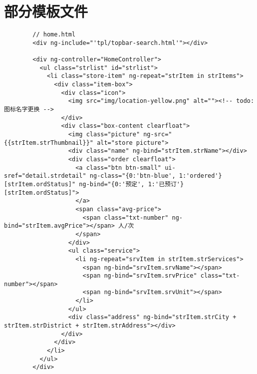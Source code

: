   \section{部分模板文件}
    \label{sec:部分模板文件}
      \begin{lstlisting}
        // home.html
        <div ng-include="'tpl/topbar-search.html'"></div>

        <div ng-controller="HomeController">
          <ul class="strlist" id="strlist">
            <li class="store-item" ng-repeat="strItem in strItems">
              <div class="item-box">
                <div class="icon">
                  <img src="img/location-yellow.png" alt=""><!-- todo: 图标名字更换 -->
                </div>
                <div class="box-content clearfloat">
                  <img class="picture" ng-src="{{strItem.strThumbnail}}" alt="store picture">
                  <div class="name" ng-bind="strItem.strName"></div>
                  <div class="order clearfloat">
                    <a class="btn btn-small" ui-sref="detail.strdetail" ng-class="{0:'btn-blue', 1:'ordered'}[strItem.ordStatus]" ng-bind="{0:'预定', 1:'已预订'}[strItem.ordStatus]">
                    </a>
                    <span class="avg-price">
                      <span class="txt-number" ng-bind="strItem.avgPrice"></span> 人/次
                    </span>
                  </div>
                  <ul class="service">
                    <li ng-repeat="srvItem in strItem.strServices">
                      <span ng-bind="srvItem.srvName"></span>
                      <span ng-bind="srvItem.srvPrice" class="txt-number"></span>
                      <span ng-bind="srvItem.srvUnit"></span>
                    </li>
                  </ul>
                  <div class="address" ng-bind="strItem.strCity + strItem.strDistrict + strItem.strAddress"></div>
                </div>
              </div>
            </li>
          </ul>
        </div>
      \end{lstlisting}
